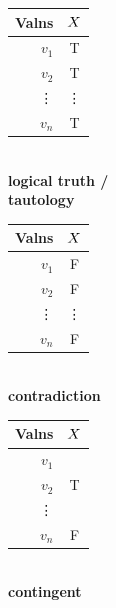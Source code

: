 \begin{highlighted}
	\begin{center}
		\begin{minipage}{.3\linewidth}
			\begin{center}
				\begin{tabular}{r | c}
					Valns & $X$\\
					\hline
					$v_1$&T\\
					$v_2$  & T \\
					\vdots & \vdots \\
					$v_n$ & T \\
				\end{tabular}\\ \textbf{logical truth /} \\
				\textbf{tautology}
			\end{center}
		\end{minipage}
		\begin{minipage}{.35\linewidth}
			\begin{center}
				\begin{tabular}{r | c}
					Valns & $X$\\
					\hline
					$v_1$&F\\
					$v_2$  & F \\
					\vdots & \vdots \\
					$v_n$ & F\\
				\end{tabular}\\ \textbf{contradiction}
			\end{center}
		\end{minipage}
		\begin{minipage}{.3\linewidth}
			\begin{center}
				\begin{tabular}{r | c}
					Valns & $X$\\
					\hline
					$v_1$&\\
					$v_2$  & T \\
					\vdots &  \\
					$v_n$ &F \\
				\end{tabular}\\ \textbf{contingent}
			\end{center}
		\end{minipage}
	\end{center}
	
	
\end{highlighted}

